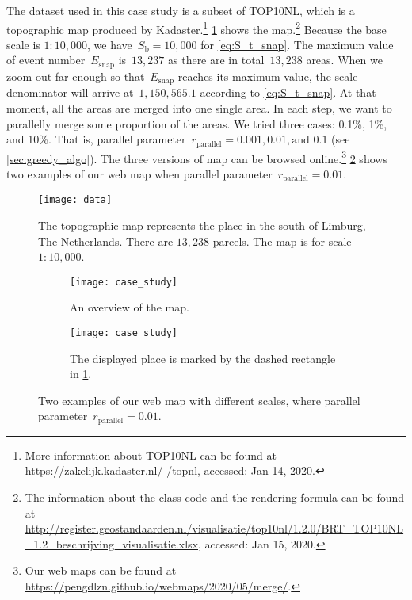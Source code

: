 \documentclass[]{interact}
\begin{document}
The dataset used in this case study is a subset of TOP10NL,
which is a topographic map produced by Kadaster.\footnote{%
More information about TOP10NL can be found at
\url{https://zakelijk.kadaster.nl/-/topnl},
accessed: Jan 14, 2020.}
%
\figs\ref{fig:data} shows the map.\footnote{%
The information about the class code and the rendering formula can be found at
\url{http://register.geostandaarden.nl/visualisatie/top10nl/1.2.0/BRT_TOP10NL_1.2_beschrijving_visualisatie.xlsx},
accessed: Jan 15, 2020.}
%
Because the base scale is $1:10{,}000$, 
we have~$S_\mathrm{b} = 10{,}000$ for \eq\ref{eq:S_t_snap}.
The maximum value of event number~$E_\mathrm{snap}$ is~$13{,}237$
as there are in total~$13{,}238$ areas.
When we zoom out far enough 
so that~$E_\mathrm{snap}$ reaches its maximum value,
the scale denominator will arrive at~$1{,}150{,}565.1$
according to \eq\ref{eq:S_t_snap}.
At that moment, all the areas are merged into one single area.
In each step, we want to parallelly merge some proportion of the areas.
We tried three cases: 0.1\%, 1\%, and 10\%.
That is, parallel parameter~$r_\mathrm{parallel}=0.001, 0.01, \text{and~} 0.1$ 
(see \sect\ref{sec:greedy_algo}).
The three versions of map can be browsed online.\footnote{%
Our web maps can be found at
\url{https://pengdlzn.github.io/webmaps/2020/05/merge/}.}
\fig\ref{fig:web_map} shows two examples of our web map when 
parallel parameter~$r_\mathrm{parallel}=0.01$.


\begin{figure}[tb]
\centering
\texttt{[image: data]}
\caption{
    The topographic map represents the place 
    in the south of Limburg, The Netherlands.
    There are $13{,}238$ parcels.
    The map is for scale $1:10{,}000$.}
\label{fig:data}
\end{figure}


\begin{figure}[tb]
\centering
\begin{subfigure}[t]{\textwidth}
\centering
\texttt{[image: case\_study]}
\caption{An overview of the map.}
\end{subfigure}
\newline
\vspace{0.3cm}
%
\begin{subfigure}[t]{\textwidth}
\centering
\texttt{[image: case\_study]}
\caption{The displayed place is marked 
    by the dashed rectangle in \fig\ref{fig:data}.}
\end{subfigure}
\caption{Two examples of our web map with different scales,
    where parallel parameter~$r_\mathrm{parallel}= 0.01$.
    }
\label{fig:web_map}
\end{figure}
\end{document}
